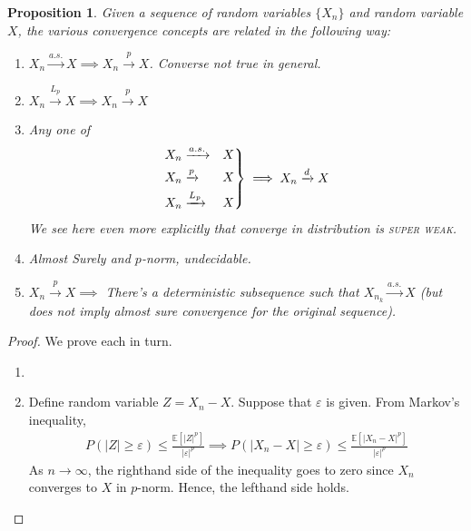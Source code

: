 \documentclass[12pt]{article}
\theoremstyle{plain}
\newtheorem{prop}[thm]{Proposition}
\theoremstyle{definition}
\theoremstyle{remark}
\newcommand{\ra}{\rightarrow}
\newcommand{\E}{\mathbb{E}}
\newenvironment{rcases}
  {\left.\begin{aligned}}
  {\end{aligned}\right\rbrace}
\newcommand{\asto}{\xrightarrow{a.s.}}
\newcommand{\pto}{\xrightarrow{p}}
\newcommand{\dto}{\xrightarrow{d}}
\newcommand{\Lpto}{\xrightarrow{L_p}}
\begin{document}
\begin{prop}
Given a sequence of random variables $\{X_n\}$ and random variable $X$,
the various convergence concepts are related in the following way:
\begin{enumerate}
  \item $X_n\asto X \implies X_n\pto X$. Converse not true in general.
  \item $X_n\Lpto X \implies X_n\pto X$
  \item Any one of
    \begin{align*}
      \begin{rcases}
        X_n&\asto &X \\
        X_n&\pto &X \\
        X_n&\Lpto &X
      \end{rcases}
      \implies X_n\dto X
    \end{align*}
    We see here even more explicitly that converge in distribution is
    \textsc{super weak}.
  \item Almost Surely and $p$-norm, undecidable.
  \item $X_n\pto X \implies$ There's a deterministic subsequence such
    that $X_{n_k}\asto X$ (but does not imply almost sure convergence
    for the original sequence).
\end{enumerate}
\end{prop}
\begin{proof}
We prove each in turn.
\begin{enumerate}
  \item

  \item Define random variable $Z=X_n-X$. Suppose that $\varepsilon$ is
    given. From Markov's inequality,
    \begin{align*}
      P(|Z| \geq \varepsilon) \leq \frac{\E[|Z|^p]}{|\varepsilon|^p}
      \implies
      P(|X_n-X| \geq \varepsilon) \leq \frac{\E[|X_n-X|^p]}{|\varepsilon|^p}
    \end{align*}
    As $n\ra\infty$, the righthand side of the inequality goes to zero
    since $X_n$ converges to $X$ in $p$-norm. Hence, the lefthand side
    holds.
\end{enumerate}
\end{proof}
\end{document}
